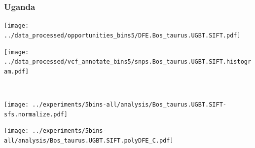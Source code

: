 \subsubsection{Uganda}

\begin{minipage}{0.49\linewidth}
    \texttt{[image: ../data\_processed/opportunities\_bins5/DFE.Bos\_taurus.UGBT.SIFT.pdf]}
\end{minipage}
\begin{minipage}{0.49\linewidth}
    \texttt{[image: ../data\_processed/vcf\_annotate\_bins5/snps.Bos\_taurus.UGBT.SIFT.histogram.pdf]}
\end{minipage}
\\
\begin{minipage}{0.49\linewidth}
    \texttt{[image: ../experiments/5bins-all/analysis/Bos\_taurus.UGBT.SIFT-sfs.normalize.pdf]}
\end{minipage}
\begin{minipage}{0.4\linewidth}
    \texttt{[image: ../experiments/5bins-all/analysis/Bos\_taurus.UGBT.SIFT.polyDFE\_C.pdf]}
\end{minipage}
